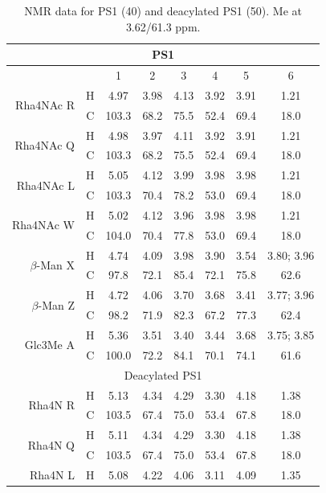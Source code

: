 		\begin{table}[h]
			\centering
			\caption{\ac{NMR} data for \caulobacter \ac{PS}1 (40\cel) and deacylated \ac{PS}1 (50\cel). Me at 3.62/61.3 ppm.}
			\label{tbl:lpsops}
			\begin{tabular}{@{}rccccccc@{}}
				\toprule
				\multicolumn{8}{c}{PS1} \\ \midrule
				 &  & 1 & 2 & 3 & 4 & 5 & 6 \\ \midrule
				\multirow{2}{*}{Rha4NAc R} & H & 4.97 & 3.98 & 4.13 & 3.92 & 3.91 & 1.21 \\
				 & C & 103.3 & 68.2 & 75.5 & 52.4 & 69.4 & 18.0 \\
				\multirow{2}{*}{Rha4NAc Q} & H & 4.98 & 3.97 & 4.11 & 3.92 & 3.91 & 1.21 \\
				 & C & 103.3 & 68.2 & 75.5 & 52.4 & 69.4 & 18.0 \\
				\multirow{2}{*}{Rha4NAc L} & H & 5.05 & 4.12 & 3.99 & 3.98 & 3.98 & 1.21 \\
				 & C & 103.3 & 70.4 & 78.2 & 53.0 & 69.4 & 18.0 \\
				\multirow{2}{*}{Rha4NAc W} & H & 5.02 & 4.12 & 3.96 & 3.98 & 3.98 & 1.21 \\
				 & C & 104.0 & 70.4 & 77.8 & 53.0 & 69.4 & 18.0 \\
				\multirow{2}{*}{$\beta$-Man X} & H & 4.74 & 4.09 & 3.98 & 3.90 & 3.54 & 3.80; 3.96 \\
				 & C & 97.8 & 72.1 & 85.4 & 72.1 & 75.8 & 62.6 \\
				\multirow{2}{*}{$\beta$-Man Z} & H & 4.72 & 4.06 & 3.70 & 3.68 & 3.41 & 3.77; 3.96 \\
				 & C & 98.2 & 71.9 & 82.3 & 67.2 & 77.3 & 62.4 \\
				\multirow{2}{*}{Glc3Me A} & H & 5.36 & 3.51 & 3.40 & 3.44 & 3.68 & 3.75; 3.85 \\
				 & C & 100.0 & 72.2 & 84.1 & 70.1 & 74.1 & 61.6 \\ \midrule
				\multicolumn{8}{c}{Deacylated PS1} \\ \midrule
				\multirow{2}{*}{Rha4N R} & H & 5.13 & 4.34 & 4.29 & 3.30 & 4.18 & 1.38 \\
				 & C & 103.5 & 67.4 & 75.0 & 53.4 & 67.8 & 18.0 \\
				\multirow{2}{*}{Rha4N Q} & H & 5.11 & 4.34 & 4.29 & 3.30 & 4.18 & 1.38 \\
				 & C & 103.5 & 67.4 & 75.0 & 53.4 & 67.8 & 18.0 \\
				\multirow{2}{*}{Rha4N L} & H & 5.08 & 4.22 & 4.06 & 3.11 & 4.09 & 1.35 \\

\end{tabular}
\end{table}
